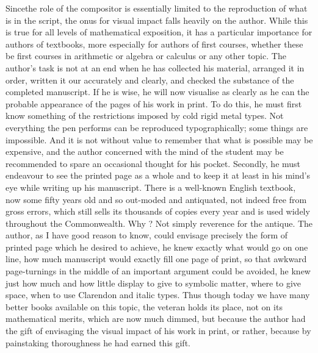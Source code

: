 Since\pageoriginale the role of the compositor is essentially limited to the reproduction of what is in the script, the onus for visual impact falls heavily on the author. While this is true for all levels of mathematical exposition, it has a particular importance for authors of textbooks, more especially for authors of first courses, whether these be first courses in arithmetic or algebra or calculus or any other topic. The author's task is not at an end when he has collected his material, arranged it in order, written it our accurately and clearly, and checked the substance of the completed manuscript. If he is wise, he will now visualise as clearly as he can the probable appearance of the pages of his work in print. To do this, he must first know something of the restrictions imposed by cold rigid metal types. Not everything the pen performs can be reproduced typographically; some things are impossible. And it is not without value to remember that what is possible may be expensive, and the author concerned with the mind of the student may be recommended to spare an occasional thought for his pocket. Secondly, he must endeavour to see the printed page as a whole and to keep it at least in his mind's eye while writing up his manuscript. There is a well-known English textbook, now some fifty years old and so out-moded and antiquated, not indeed free from gross errors, which still sells its thousands of copies every year and is used widely throughout the Commonwealth. Why ? Not simply reverence for the antique. The author, as I have good reason to know, could envisage precisely the form of printed page which he desired to achieve, he knew exactly what would go on one line, how much manuscript would exactly fill one page of print, so that awkward page-turnings in the middle of an important argument could be avoided, he knew just how much and how little display to give to symbolic matter, where to give space, when to use Clarendon and italic types. Thus though today we have many better books available on this topic, the veteran holds its place, not on its mathematical merits, which are now much dimmed, but because the author had the gift of envisaging the visual impact of his work in print, or rather, because by painstaking thoroughness he had earned this gift.

